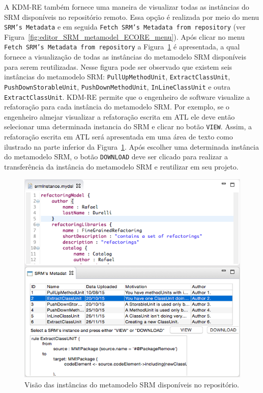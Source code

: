  A KDM-RE também fornece uma maneira de visualizar todas as instâncias do SRM disponíveis no repositório remoto. Essa opção é realizada por meio do menu \texttt{SRM's Metadata} e em seguida \texttt{Fetch SRM's Metadata from repository} (ver Figura~\ref{fig:editor_SRM_metamodel_ECORE_menu}). Após clicar no menu \texttt{Fetch SRM's Metadata from repository} a Figura~\ref{fig:download_kDM_re_repository} é apresentada, a qual fornece a visualização de todas as instâncias do metamodelo SRM disponíveis para serem reutilizadas. Nesse figura pode ser observado que existem seis instâncias do metamodelo SRM: \texttt{PullUpMethodUnit}, \texttt{ExtractClassUnit}, \texttt{PushDownStorableUnit}, \texttt{PushDownMethodUnit}, \texttt{InLineClassUnit} e outra \texttt{ExtractClassUnit}. KDM-RE permite que o engenheiro de software visualize a refatoração para cada instância do metamodelo SRM. Por exemplo, se o engenheiro almejar visualizar a refatoração escrita em ATL ele deve então selecionar uma determinada instancia do SRM e clicar no botão \texttt{VIEW}. Assim, a refatoração escrita em ATL será apresentada em uma área de texto como ilustrado na parte inferior da Figura~\ref{fig:download_kDM_re_repository}. Após escolher uma determinada instância do metamodelo SRM, o botão \texttt{DOWNLOAD} deve ser clicado para realizar a transferência da instância do metamodelo SRM e reutilizar em seu projeto. 

\begin{figure}[!h]
	\centering
	\caption{Visão das instâncias do metamodelo SRM disponíveis no repositório.}
	\label{fig:download_kDM_re_repository}
	\includegraphics[scale=0.7]{images/DOWNLOAD_KDM_RE}
	\fautor
\end{figure}



